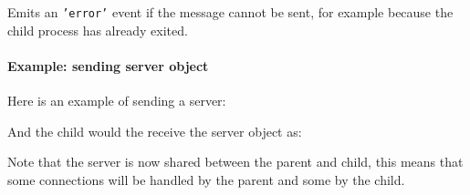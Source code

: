 Emits an \texttt{'error'} event if the message cannot be sent, for
example because the child process has already exited.

\paragraph{Example: sending server object}

Here is an example of sending a server:

\begin{Shaded}
\begin{Highlighting}[]
 \NormalTok{(}\NormalTok{);}

 \NormalTok{();}
\NormalTok{(}\NormalTok{, } 
  \NormalTok{(}\NormalTok{);}
\NormalTok{\});}
\NormalTok{(}\NormalTok{, }\NormalTok{() \{}
  \NormalTok{(}
\NormalTok{\});}
\end{Highlighting}
\end{Shaded}

And the child would the receive the server object as:

\begin{Shaded}
\begin{Highlighting}[]
\NormalTok{(}\NormalTok{, }
   \NormalTok{) \{}
    \NormalTok{(}\NormalTok{, } 
      \NormalTok{(}\NormalTok{);}
    \NormalTok{\});}
  \NormalTok{\}}
\NormalTok{\});}
\end{Highlighting}
\end{Shaded}

Note that the server is now shared between the parent and child, this
means that some connections will be handled by the parent and some by
the child.

